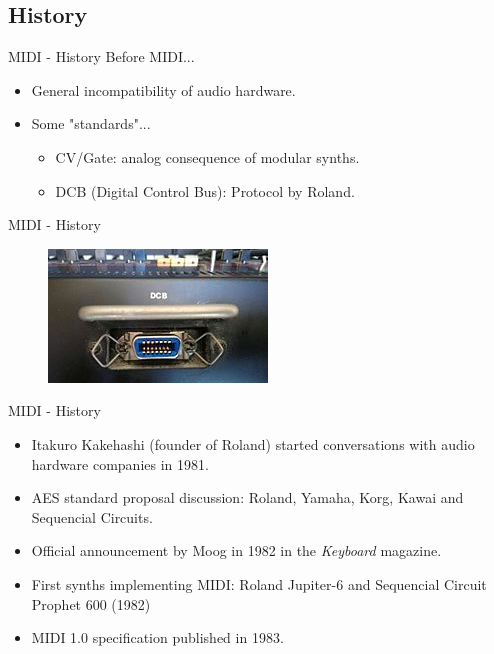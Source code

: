 \documentclass{beamer}
\begin{document}
\subsection{History}

\begin{frame}{MIDI - History}
   Before MIDI...
   \vspace{5mm}
   \begin{itemize}
       \item General incompatibility of audio hardware.
       \item Some "standards"...
       \begin{itemize}
           \item CV/Gate: analog consequence of modular synths.
           \item DCB (Digital Control Bus): Protocol by Roland.
       \end{itemize}
   \end{itemize}
\end{frame}

\begin{frame}{MIDI - History}
    \begin{figure}[h]
        \includegraphics[width=\textwidth]{220px-DCB_interface.jpg}
    \end{figure}
\end{frame}

\begin{frame}{MIDI - History}
    \begin{itemize}
        \item Itakuro Kakehashi (founder of Roland) started conversations with audio hardware companies in 1981.
        \item AES standard proposal discussion: Roland, Yamaha, Korg, Kawai and Sequencial Circuits. 
        \item Official announcement by Moog in 1982 in the \textit{Keyboard} magazine.
        \item First synths implementing MIDI: Roland Jupiter-6 and Sequencial Circuit Prophet 600 (1982)
        \item MIDI 1.0 specification published in 1983.
    \end{itemize}
\end{frame}
\end{document}
